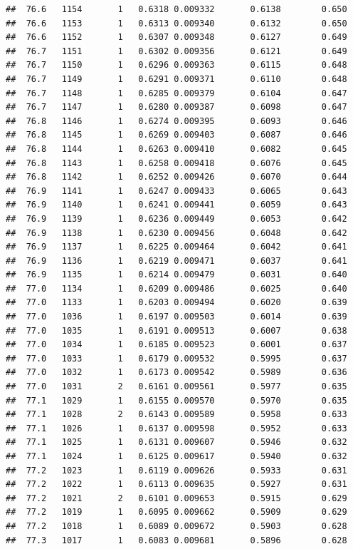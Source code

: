 \documentclass[
]{book}
\begin{document}
\begin{verbatim}
##  76.6   1154       1   0.6318 0.009332       0.6138        0.650
##  76.6   1153       1   0.6313 0.009340       0.6132        0.650
##  76.6   1152       1   0.6307 0.009348       0.6127        0.649
##  76.7   1151       1   0.6302 0.009356       0.6121        0.649
##  76.7   1150       1   0.6296 0.009363       0.6115        0.648
##  76.7   1149       1   0.6291 0.009371       0.6110        0.648
##  76.7   1148       1   0.6285 0.009379       0.6104        0.647
##  76.7   1147       1   0.6280 0.009387       0.6098        0.647
##  76.8   1146       1   0.6274 0.009395       0.6093        0.646
##  76.8   1145       1   0.6269 0.009403       0.6087        0.646
##  76.8   1144       1   0.6263 0.009410       0.6082        0.645
##  76.8   1143       1   0.6258 0.009418       0.6076        0.645
##  76.8   1142       1   0.6252 0.009426       0.6070        0.644
##  76.9   1141       1   0.6247 0.009433       0.6065        0.643
##  76.9   1140       1   0.6241 0.009441       0.6059        0.643
##  76.9   1139       1   0.6236 0.009449       0.6053        0.642
##  76.9   1138       1   0.6230 0.009456       0.6048        0.642
##  76.9   1137       1   0.6225 0.009464       0.6042        0.641
##  76.9   1136       1   0.6219 0.009471       0.6037        0.641
##  76.9   1135       1   0.6214 0.009479       0.6031        0.640
##  77.0   1134       1   0.6209 0.009486       0.6025        0.640
##  77.0   1133       1   0.6203 0.009494       0.6020        0.639
##  77.0   1036       1   0.6197 0.009503       0.6014        0.639
##  77.0   1035       1   0.6191 0.009513       0.6007        0.638
##  77.0   1034       1   0.6185 0.009523       0.6001        0.637
##  77.0   1033       1   0.6179 0.009532       0.5995        0.637
##  77.0   1032       1   0.6173 0.009542       0.5989        0.636
##  77.0   1031       2   0.6161 0.009561       0.5977        0.635
##  77.1   1029       1   0.6155 0.009570       0.5970        0.635
##  77.1   1028       2   0.6143 0.009589       0.5958        0.633
##  77.1   1026       1   0.6137 0.009598       0.5952        0.633
##  77.1   1025       1   0.6131 0.009607       0.5946        0.632
##  77.1   1024       1   0.6125 0.009617       0.5940        0.632
##  77.2   1023       1   0.6119 0.009626       0.5933        0.631
##  77.2   1022       1   0.6113 0.009635       0.5927        0.631
##  77.2   1021       2   0.6101 0.009653       0.5915        0.629
##  77.2   1019       1   0.6095 0.009662       0.5909        0.629
##  77.2   1018       1   0.6089 0.009672       0.5903        0.628
##  77.3   1017       1   0.6083 0.009681       0.5896        0.628

\end{verbatim}
\end{document}
